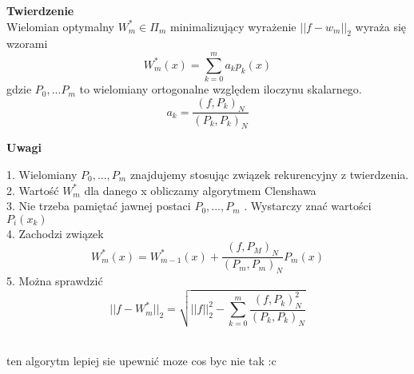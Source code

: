 \documentclass[polish]{kbk}
\begin{document}
\textbf{Twierdzenie} \\
Wielomian optymalny \( W^{*}_m \in \Pi_m \) minimalizujący wyrażenie \( || f - w_m ||_2 \) wyraża się wzorami 
$$ W^{*}_m(x) = \sum_{k=0}^m a_kp_k(x) $$ gdzie
\( P_0, ... P_m \) to wielomiany ortogonalne względem iloczynu skalarnego.
$$ a_k = \frac { (f, P_k)_N }{ (P_k, P_k)_N } $$

\begin{center}
\textbf{Uwagi}
\end{center}

1. Wielomiany \(P_0, ... , P_m\) znajdujemy stosując związek rekurencyjny z twierdzenia.\\
2. Wartość  \( W^{*}_m \) dla danego x obliczamy algorytmem Clenshawa \\
3. Nie trzeba pamiętać jawnej postaci \(P_0, ... , P_m\)  . Wystarczy znać wartości \(P_i(x_k)\)  \\
4. Zachodzi związek
$$ W^{*}_m (x) = W^{*}_{m-1}(x) + \frac{ (f, P_M)_N} {(P_m, P_m)_N} P_m(x) $$
5. Można sprawdzić
$$ || f - W^{*}_m||_2 = \sqrt{ ||f||^2_2 - \sum_{k=0}^m \frac { (f, P_k)^{2}_N} { (P_k, P_k)_N } } $$ ~\cite{znaczek2}

\begin{thebibliography}{99}
 ten algorytm lepiej sie upewnić
 moze cos byc nie tak :c
\end{thebibliography}
\end{document}
